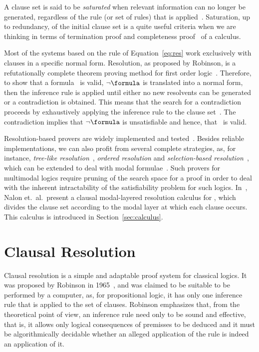 A clause set is said to be \emph{saturated} when relevant information can no
longer be generated, regardless of the rule (or set of rules) that is
applied~\cite{dershowitz2003abstract}. Saturation, up to redundancy, of the
initial clause set is a quite useful criteria when we are thinking in terms of
termination proof and completeness proof~\cite{fitting} of a calculus.

Most of the systems based on the rule of Equation~\ref{eq:res} work exclusively
with clauses in a specific normal form. Resolution, as proposed by Robinson, is
a refutationally complete theorem proving method for first order
logic~\cite{Robinson65}.  Therefore, to show that a formula \formula~is valid,
$\neg \formula$ is translated into a normal form, then the inference rule is
applied until either no new resolvents can be generated or a contradiction is
obtained. This means that the search for a contradiction proceeds by
exhaustively applying the inference rule to the clause
set~\cite{bachmair2001resolution}. The contradiction implies that $\neg
\formula$ is unsatisfiable and hence, that \formula~is valid. 

Resolution-based provers are widely implemented and
tested~\cite{bachmair2001resolution}. Besides reliable implementations, we can
also profit from several complete strategies, as, for instance, \emph{tree-like
resolution}~\cite{satchapter}, \emph{ordered resolution} and
\emph{selection-based resolution}~\cite{de2000resolution}, which can be
extended to deal with modal formulae~\cite{journals/jal/NalonD07}. Such provers
for multimodal logics require pruning of the search space for a proof in order
to deal with the inherent intractability of the satisfiability problem for such
logics.  In~\cite{nalon2015modal}, Nalon et.\ al.\ present a clausal
modal-layered resolution calculus for , which divides the clause
set according to the modal layer at which each clause occurs. This calculus is
introduced in Section~\ref{sec:calculus}.

\section{Clausal Resolution}

Clausal resolution is a simple and adaptable proof system for classical logics.
It was proposed by Robinson in 1965~\cite{Robinson65}, and was claimed to be
suitable to be performed by a computer, as, for propositional logic, it has only
one inference rule that is applied to the set of clauses. Robinson
emphasizes that, from the theoretical point of view, an inference rule need only
to be sound and effective, that is, it allows only logical consequences of
premisses to be deduced and it must be algorithmically decidable whether an
alleged application of the rule is indeed an application of it.

